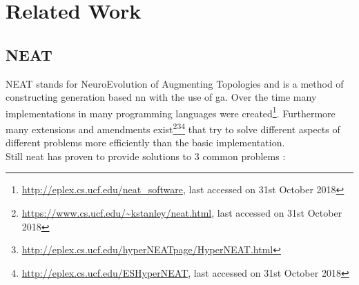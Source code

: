 %
\chapter{Related Work}
\label{sec:related}

\section{NEAT}
\label{sec:related:neat}
	NEAT stands for NeuroEvolution of Augmenting Topologies and is a method of constructing generation based \gls{nn} with the use of \gls{ga}. \cite{stanley_evolving_2002}
	Over the time many implementations in many programming languages were created\footnote{\url{http://eplex.cs.ucf.edu/neat_software}, last accessed on 31st October 2018}. Furthermore many extensions and amendments exist\footnote{\url{https://www.cs.ucf.edu/~kstanley/neat.html}, last accessed on 31st October 2018}\footnote{\url{http://eplex.cs.ucf.edu/hyperNEATpage/HyperNEAT.html}}\footnote{\url{http://eplex.cs.ucf.edu/ESHyperNEAT}, last accessed on 31st October 2018} that try to solve different aspects of different problems more efficiently than the basic implementation.\cite{kohl_integrated_2011} \\
	Still \gls{neat} has proven to provide solutions to 3 common problems \cite{stanley_evolving_2002}: 
